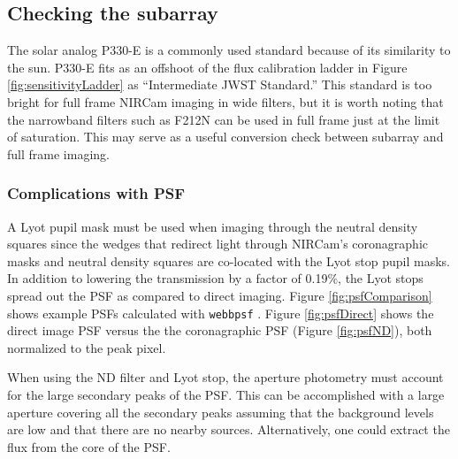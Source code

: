 \documentclass{aastex6}
\begin{document}
\subsection{Checking the subarray}
The solar analog P330-E is a commonly used standard because of its similarity to the sun.
P330-E fits as an offshoot of the flux calibration ladder in Figure \ref{fig:sensitivityLadder} as ``Intermediate JWST Standard.'' 
This standard is too bright for full frame NIRCam imaging in wide filters, but it is worth noting that the narrowband filters such as F212N can be used in full frame just at the limit of saturation.
This may serve as a useful conversion check between subarray and full frame imaging.

\subsubsection{Complications with PSF}
A Lyot pupil mask must be used when imaging through the neutral density squares since the wedges that redirect light through NIRCam's coronagraphic masks and neutral density squares are co-located with the Lyot stop pupil masks.
In addition to lowering the transmission by a factor of 0.19\%, the Lyot stops spread out the PSF as compared to direct imaging.
Figure \ref{fig:psfComparison} shows example PSFs calculated with \texttt{webbpsf} \citep{perrin2012webbpsf}.
Figure \ref{fig:psfDirect} shows the direct image PSF versus the the coronagraphic PSF (Figure \ref{fig:psfND}), both normalized to the peak pixel.

When using the ND filter and Lyot stop, the aperture photometry must account for the large secondary peaks of the PSF.
This can be accomplished with a large aperture covering all the secondary peaks assuming that the background levels are low and that there are no nearby sources.
Alternatively, one could extract the flux from the core of the PSF.
\end{document}
